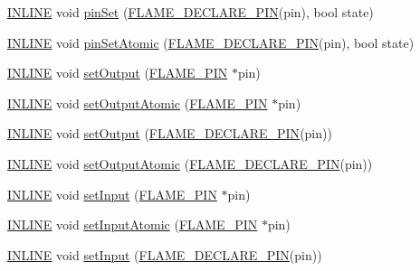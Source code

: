 \begin{DoxyCompactItemize}
\item 
\hyperlink{io_8h_a2eb6f9e0395b47b8d5e3eeae4fe0c116}{I\-N\-L\-I\-N\-E} void \hyperlink{namespaceflame_a080801989a85e65428dc3a48e78a1425}{pin\-Set} (\hyperlink{io_8h_ab54f3ca5cc36256b922289e8e92316a3}{F\-L\-A\-M\-E\-\_\-\-D\-E\-C\-L\-A\-R\-E\-\_\-\-P\-I\-N}(pin), bool state)
\item 
\hyperlink{io_8h_a2eb6f9e0395b47b8d5e3eeae4fe0c116}{I\-N\-L\-I\-N\-E} void \hyperlink{namespaceflame_aa14906ebae1e649ddc3bf91477bc110e}{pin\-Set\-Atomic} (\hyperlink{io_8h_ab54f3ca5cc36256b922289e8e92316a3}{F\-L\-A\-M\-E\-\_\-\-D\-E\-C\-L\-A\-R\-E\-\_\-\-P\-I\-N}(pin), bool state)
\item 
\hyperlink{io_8h_a2eb6f9e0395b47b8d5e3eeae4fe0c116}{I\-N\-L\-I\-N\-E} void \hyperlink{namespaceflame_a131f67aa0e3fd2753870faa340a51758}{set\-Output} (\hyperlink{namespaceflame_ae345f4de995f89125721dd4f5cd4cd9f}{F\-L\-A\-M\-E\-\_\-\-P\-I\-N} $\ast$pin)
\item 
\hyperlink{io_8h_a2eb6f9e0395b47b8d5e3eeae4fe0c116}{I\-N\-L\-I\-N\-E} void \hyperlink{namespaceflame_ad0b370b8a59aef2c3038e38a53cc168d}{set\-Output\-Atomic} (\hyperlink{namespaceflame_ae345f4de995f89125721dd4f5cd4cd9f}{F\-L\-A\-M\-E\-\_\-\-P\-I\-N} $\ast$pin)
\item 
\hyperlink{io_8h_a2eb6f9e0395b47b8d5e3eeae4fe0c116}{I\-N\-L\-I\-N\-E} void \hyperlink{namespaceflame_aa4da9bd1c966d26a59ca6664ed413f39}{set\-Output} (\hyperlink{io_8h_ab54f3ca5cc36256b922289e8e92316a3}{F\-L\-A\-M\-E\-\_\-\-D\-E\-C\-L\-A\-R\-E\-\_\-\-P\-I\-N}(pin))
\item 
\hyperlink{io_8h_a2eb6f9e0395b47b8d5e3eeae4fe0c116}{I\-N\-L\-I\-N\-E} void \hyperlink{namespaceflame_a6d2236ead96622dbd33164c00d9a01b8}{set\-Output\-Atomic} (\hyperlink{io_8h_ab54f3ca5cc36256b922289e8e92316a3}{F\-L\-A\-M\-E\-\_\-\-D\-E\-C\-L\-A\-R\-E\-\_\-\-P\-I\-N}(pin))
\item 
\hyperlink{io_8h_a2eb6f9e0395b47b8d5e3eeae4fe0c116}{I\-N\-L\-I\-N\-E} void \hyperlink{namespaceflame_acadc7cb0886889a2faabef8fde352bfa}{set\-Input} (\hyperlink{namespaceflame_ae345f4de995f89125721dd4f5cd4cd9f}{F\-L\-A\-M\-E\-\_\-\-P\-I\-N} $\ast$pin)
\item 
\hyperlink{io_8h_a2eb6f9e0395b47b8d5e3eeae4fe0c116}{I\-N\-L\-I\-N\-E} void \hyperlink{namespaceflame_ae113c5092144e24aefbd391c1597846f}{set\-Input\-Atomic} (\hyperlink{namespaceflame_ae345f4de995f89125721dd4f5cd4cd9f}{F\-L\-A\-M\-E\-\_\-\-P\-I\-N} $\ast$pin)
\item 
\hyperlink{io_8h_a2eb6f9e0395b47b8d5e3eeae4fe0c116}{I\-N\-L\-I\-N\-E} void \hyperlink{namespaceflame_a4a4163368e41cc0580a0f079c54d1d56}{set\-Input} (\hyperlink{io_8h_ab54f3ca5cc36256b922289e8e92316a3}{F\-L\-A\-M\-E\-\_\-\-D\-E\-C\-L\-A\-R\-E\-\_\-\-P\-I\-N}(pin))

\end{DoxyCompactItemize}
